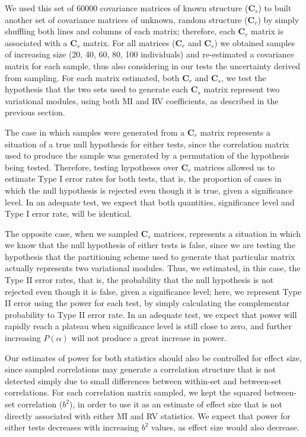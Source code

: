 \documentclass[12pt,twoside]{report}
\begin{document}
We used this set of 60000 covariance matrices of known structure
($\mathbf{C}_s$) to built another set of covariance matrices of unknown,
random structure ($\mathbf{C}_r$) by simply shuffling both lines and
columns of each matrix; therefore, each $\mathbf{C}_r$ matrix is
associated with a $\mathbf{C}_s$ matrix. For all matrices
($\mathbf{C}_r$ and $\mathbf{C}_s$) we obtained samples of increasing
size (20, 40, 60, 80, 100 individuals) and re-estimated a covariance
matrix for each sample, thus also considering in our tests the
uncertainty derived from sampling. For each matrix estimated, both
$\mathbf{C}_r$ and $\mathbf{C}_s$, we test the hypothesis that the two
sets used to generate each $\mathbf{C}_s$ matrix represent two
variational modules, using both MI and RV coefficients, as described in
the previous section.

The case in which samples were generated from a $\mathbf{C}_r$ matrix
represents a situation of a true null hypothesis for either tests, since
the correlation matrix used to produce the sample was generated by a
permutation of the hypothesis being tested. Therefore, testing
hypotheses over $\mathbf{C}_r$ matrices allowed us to estimate Type I
error rates for both tests, that is, the proportion of cases in which
the null hypothesis is rejected even though it is true, given a
significance level. In an adequate test, we expect that both quantities,
significance level and Type I error rate, will be identical.

The opposite case, when we sampled $\mathbf{C}_s$ matrices, represents a
situation in which we know that the null hypothesis of either tests is
false, since we are testing the hypothesis that the partitioning scheme
used to generate that particular matrix actually represents two
variational modules. Thus, we estimated, in this case, the Type II error
rates, that is, the probability that the null hypothesis is not rejected
even though it is false, given a significance level; here, we represent
Type II error using the power for each test, by simply calculating the
complementar probability to Type II error rate. In an adequate test, we
expect that power will rapidly reach a plateau when significance level
is still close to zero, and further increasing $P(\alpha)$ will not
produce a great increase in power.

Our estimates of power for both statistics should also be controlled for
effect size, since sampled correlations may generate a correlation
structure that is not detected simply due to small differences between
within-set and between-set correlations. For each correlation matrix
sampled, we kept the squared between-set correlation ($b^2$), in order
to use it as an estimate of effect size that is not directly associated
with either MI and RV statistics. We expect that power for either tests
decreases with increasing $b^2$ values, as effect size would also
decrease.
\end{document}
